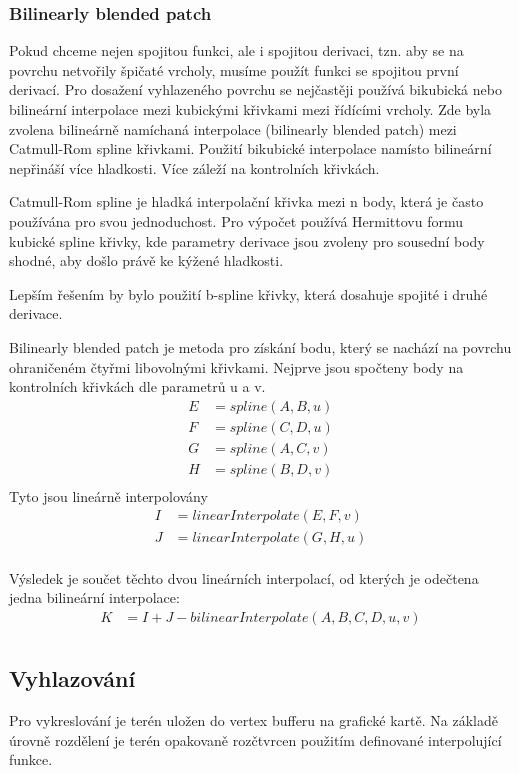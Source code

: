 \documentclass[11pt]{article}
\begin{document}
\subsubsection{Bilinearly blended patch}
Pokud chceme nejen spojitou funkci, ale i spojitou derivaci, tzn. aby se na
povrchu netvořily špičaté vrcholy, musíme použít funkci se spojitou první
derivací. Pro dosažení vyhlazeného povrchu se nejčastěji používá bikubická nebo
bilineární interpolace mezi kubickými křivkami mezi řídícími vrcholy. Zde byla
zvolena bilineárně namíchaná interpolace (bilinearly blended patch) mezi
Catmull-Rom spline křivkami. Použití bikubické interpolace namísto bilineární
nepřináší více hladkosti. Více záleží na kontrolních křivkách.

Catmull-Rom spline je hladká interpolační křivka mezi n body, která je často
používána pro svou jednoduchost. Pro výpočet používá Hermittovu formu kubické spline křivky, kde parametry derivace jsou zvoleny pro sousední body shodné, aby došlo právě ke kýžené hladkosti.

Lepším řešením by bylo použití b-spline křivky, která dosahuje spojité i druhé derivace.

Bilinearly blended patch je metoda pro získání bodu, který se nachází na povrchu ohraničeném čtyřmi libovolnými křivkami.
Nejprve jsou spočteny body na kontrolních křivkách dle parametrů u a v. 
\begin{align*}
E &= spline(A, B, u) \\
F &= spline(C, D, u) \\
G &= spline(A, C, v) \\
H &= spline(B, D, v) \\
\end{align*}
Tyto jsou lineárně interpolovány
\begin{align*}
I &= linearInterpolate(E, F, v) \\
J &= linearInterpolate(G, H, u) \\
\end{align*}

Výsledek je součet těchto dvou lineárních interpolací, od kterých je odečtena jedna bilineární interpolace:
\begin{align*}
K &= I + J - bilinearInterpolate(A, B, C, D, u, v) \\
\end{align*}

\subsection{Vyhlazování}
Pro vykreslování je terén uložen do vertex bufferu na grafické kartě. Na
základě úrovně rozdělení je terén opakovaně rozčtvrcen použitím definované
interpolující funkce.
\end{document}
